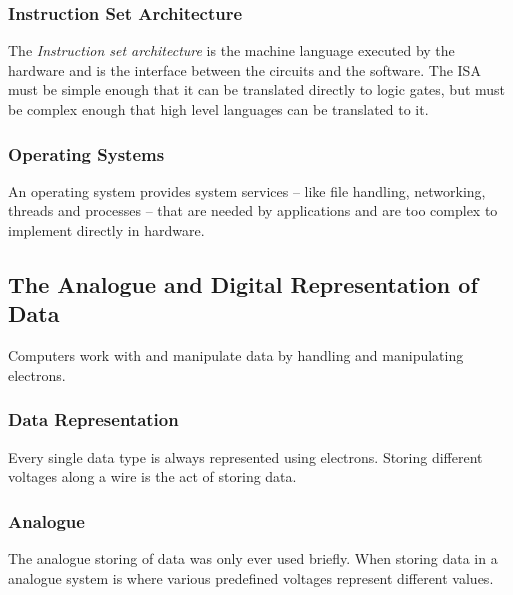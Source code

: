 \subsubsection{Instruction Set Architecture}\label{ssub:instruction_set_architecture}

The \emph{Instruction set architecture} is the machine language executed by the hardware and is the interface between the circuits and the software.
The ISA must be simple enough that it can be translated directly to logic gates, but must be complex enough that high level languages can be translated to it.

\subsubsection{Operating Systems}\label{ssub:operating_systems}

An operating system provides system services -- like file handling, networking, threads and processes -- that are needed by applications and are too complex to implement directly in hardware.

\subsection{The Analogue and Digital Representation of Data}\label{sub:the_analogue_and_digital_representation_of_data}

Computers work with and manipulate data by handling and manipulating electrons.

\subsubsection{Data Representation}\label{ssub:data_representation}

Every single data type is always represented using electrons.
Storing different voltages along a wire is the act of storing data.

\subsubsection{Analogue}\label{ssub:analogue}

The analogue storing of data was only ever used briefly.
When storing data in a analogue system is where various predefined voltages represent different values.

